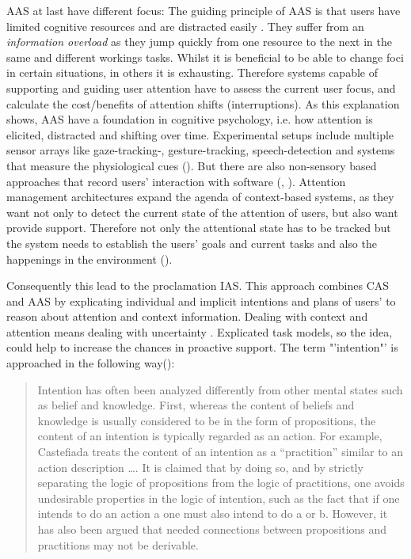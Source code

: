 \ac{AAS} at last have different focus: The guiding principle of \acs{AAS} is that users have limited cognitive resources and are distracted easily . They suffer from an \textit{information overload} as they jump quickly from one resource to the next in the same and different workings tasks. Whilst it is beneficial to be able to change foci in certain situations, in others it is exhausting. Therefore systems capable of supporting and guiding user attention have to assess the current user focus, and calculate the cost/benefits of attention shifts (interruptions). As this explanation shows, \acs{AAS} have a foundation in cognitive psychology, i.e. how attention is elicited, distracted and shifting over time. Experimental setups include multiple sensor arrays like  gaze-tracking-, gesture-tracking, speech-detection and systems that measure the physiological cues (\cite{roda2006attention}). But there are also non-sensory based approaches that record users' interaction with software (\cite{horvitz2003models}, \cite{schmitz2011contextualized}). Attention management architectures expand the agenda of context-based systems, as they want not only to detect the current state of the attention of users, but also want provide support. Therefore not only the attentional state has to be tracked but the system needs to establish the users' goals and current tasks and also the happenings in the environment (\cite{roda2006attention}). 

Consequently this lead to the proclamation \ac{IAS}. This approach combines \acs{CAS} and \acs{AAS} by explicating individual and implicit intentions and plans of users' to reason about attention and context information. Dealing with context and attention means dealing with uncertainty . Explicated task models, so the idea, could help to increase the chances in proactive support. The term "'intention"' is  approached in the following way(\cite{cohen1990intention}):
\begin{quotation}
  Intention has often been analyzed differently from other mental states such as belief and knowledge. First, whereas the content of beliefs and knowledge is usually considered to be in the form of propositions, the content of an intention is typically regarded as an action. For example, Castefiada treats the content of an intention as a "`practition"' similar to an action description \dots. It is claimed that by doing so, and by strictly separating the logic of propositions from the logic of practitions, one avoids undesirable properties in the logic of intention, such as the fact that if one intends to do an action a one must also intend to do a or b. However, it has also been argued that needed connections between propositions and practitions may not be derivable.
\end{quotation}


